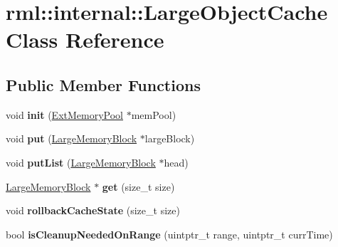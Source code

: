 \hypertarget{classrml_1_1internal_1_1LargeObjectCache}{}\section{rml\+:\+:internal\+:\+:Large\+Object\+Cache Class Reference}
\label{classrml_1_1internal_1_1LargeObjectCache}
\subsection*{Public Member Functions}
\begin{DoxyCompactItemize}
\item 
\hypertarget{classrml_1_1internal_1_1LargeObjectCache_a6d0ad7fb19024f608cf1fc9a4114edfd}{}void {\bfseries init} (\hyperlink{structrml_1_1internal_1_1ExtMemoryPool}{Ext\+Memory\+Pool} $\ast$mem\+Pool)\label{classrml_1_1internal_1_1LargeObjectCache_a6d0ad7fb19024f608cf1fc9a4114edfd}

\item 
\hypertarget{classrml_1_1internal_1_1LargeObjectCache_ace538324fc0411a742ac233fe3ebc714}{}void {\bfseries put} (\hyperlink{structrml_1_1internal_1_1LargeMemoryBlock}{Large\+Memory\+Block} $\ast$large\+Block)\label{classrml_1_1internal_1_1LargeObjectCache_ace538324fc0411a742ac233fe3ebc714}

\item 
\hypertarget{classrml_1_1internal_1_1LargeObjectCache_a0790e2036c25d46c9070207bb79a9bec}{}void {\bfseries put\+List} (\hyperlink{structrml_1_1internal_1_1LargeMemoryBlock}{Large\+Memory\+Block} $\ast$head)\label{classrml_1_1internal_1_1LargeObjectCache_a0790e2036c25d46c9070207bb79a9bec}

\item 
\hypertarget{classrml_1_1internal_1_1LargeObjectCache_ad3382cd2d65b0ad2b5b4c54aa2f6e55f}{}\hyperlink{structrml_1_1internal_1_1LargeMemoryBlock}{Large\+Memory\+Block} $\ast$ {\bfseries get} (size\+\_\+t size)\label{classrml_1_1internal_1_1LargeObjectCache_ad3382cd2d65b0ad2b5b4c54aa2f6e55f}

\item 
\hypertarget{classrml_1_1internal_1_1LargeObjectCache_aca1e8203d77feabec0cd9a285f20d63b}{}void {\bfseries rollback\+Cache\+State} (size\+\_\+t size)\label{classrml_1_1internal_1_1LargeObjectCache_aca1e8203d77feabec0cd9a285f20d63b}

\item 
\hypertarget{classrml_1_1internal_1_1LargeObjectCache_adfdb07fd29c0ea78b65c324b852ef073}{}bool {\bfseries is\+Cleanup\+Needed\+On\+Range} (uintptr\+\_\+t range, uintptr\+\_\+t curr\+Time)\label{classrml_1_1internal_1_1LargeObjectCache_adfdb07fd29c0ea78b65c324b852ef073}


\end{DoxyCompactItemize}
